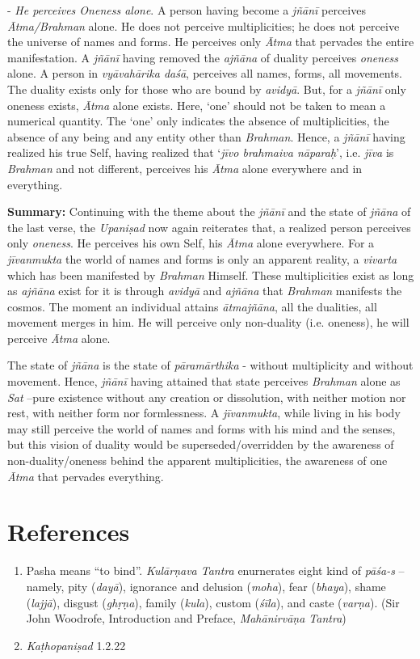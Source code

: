 - \emph{He perceives Oneness alone}. A person having become a \emph{jñānī} perceives \emph{Ātma/Brahman} alone. He does not perceive multiplicities; he does not perceive the universe of names and forms. He perceives only \emph{Ātma} that pervades the entire manifestation. A \emph{jñānī} having removed the \emph{ajñāna} of duality perceives \emph{oneness} alone. A person in \emph{vyāvahārika daśā}, perceives all names, forms, all movements. The duality exists only for those who are bound by \emph{avidyā}. But, for a \emph{jñānī} only oneness exists, \emph{Ātma} alone exists. Here, `one' should not be taken to mean a numerical quantity. The `one' only indicates the absence of multiplicities, the absence of any being and any entity other than \emph{Brahman}. Hence, a \emph{jñānī} having realized his true Self, having realized that `\emph{jīvo brahmaiva nāparaḥ}', i.e. \emph{jīva} is \emph{Brahman} and not different, perceives his \emph{Ātma} alone everywhere and in everything.

\textbf{Summary:} Continuing with the theme about the \emph{jñānī} and the state of \emph{jñāna} of the last verse, the \emph{Upaniṣad} now again reiterates that, a realized person perceives only \emph{oneness}. He perceives his own Self, his \emph{Ātma} alone everywhere. For a \emph{jīvanmukta} the world of names and forms is only an apparent reality, a \emph{vivarta} which has been manifested by \emph{Brahman} Himself. These multiplicities exist as long as \emph{ajñāna} exist for it is through \emph{avidyā} and \emph{ajñāna} that \emph{Brahman} manifests the cosmos. The moment an individual attains \emph{ātmajñāna}, all the dualities, all movement merges in him. He will perceive only non-duality (i.e. oneness), he will perceive \emph{Ātma} alone.

The state of \emph{jñāna} is the state of \emph{pāramārthika} - without multiplicity and without movement. Hence, \emph{jñānī} having attained that state perceives \emph{Brahman} alone as \emph{Sat} --pure existence without any creation or dissolution, with neither motion nor rest, with neither form nor formlessness. A \emph{jīvanmukta}, while living in his body may still perceive the world of names and forms with his mind and the senses, but this vision of duality would be superseded/overridden by the awareness of non-duality/oneness behind the apparent multiplicities, the awareness of one \emph{Ātma} that pervades everything.

\section*{References}

\begin{enumerate}
\item
  Pasha means ``to bind''. \emph{Kulārṇava Tantra} enurnerates eight kind of \emph{pāśa-s} -- namely, pity (\emph{dayā}), ignorance and delusion (\emph{moha}), fear (\emph{bhaya}), shame (\emph{lajjā}), disgust (\emph{ghṛṇa}), family (\emph{kula}), custom (\emph{śīla}), and caste (\emph{varṇa}). (Sir John Woodrofe, Introduction and Preface, \emph{Mahānirvāṇa Tantra})
\item
  \emph{Kaṭhopaniṣad} 1.2.22
\end{enumerate}
